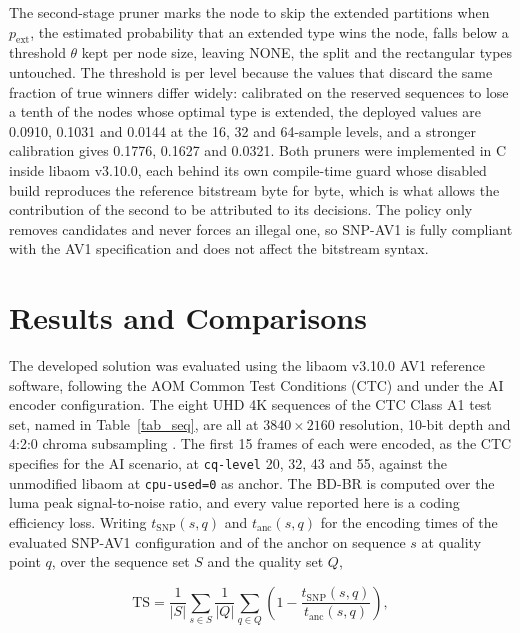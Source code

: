 \documentclass[conference]{IEEEtran}
\begin{document}
The second-stage pruner marks the node to skip the extended partitions when
$p_{\mathrm{ext}}$, the estimated probability that an extended type wins the node,
falls below a threshold $\theta$ kept per node size, leaving NONE, the split and
the rectangular types untouched. The threshold is per level because the values
that discard the same fraction of true winners differ widely: calibrated on the
reserved sequences to lose a tenth of the nodes whose optimal type is extended,
the deployed values are 0.0910, 0.1031 and 0.0144 at the 16, 32 and 64-sample
levels, and a stronger calibration gives 0.1776, 0.1627 and 0.0321. Both pruners
were implemented in C inside libaom v3.10.0, each behind its own compile-time
guard whose disabled build reproduces the reference bitstream byte for byte,
which is what allows the contribution of the second to be attributed to its
decisions. The policy only removes candidates and never forces an illegal one, so
SNP-AV1 is fully compliant with the AV1 specification and does not affect the
bitstream syntax.

\section{Results and Comparisons}
\label{sec_results}

The developed solution was evaluated using the libaom v3.10.0 AV1 reference
software, following the AOM Common Test Conditions (CTC) \cite{ctc} and under the
AI encoder configuration. The eight UHD 4K sequences of the CTC Class A1 test set,
named in Table~\ref{tab_seq}, are all at $3840\times2160$ resolution, 10-bit depth
and 4:2:0 chroma subsampling \cite{xipha1}. The first 15 frames of each were
encoded, as the CTC specifies for the AI scenario, at \texttt{cq-level} 20, 32, 43
and 55, against the unmodified libaom at \texttt{cpu-used=0} as anchor. The BD-BR
\cite{bjontegaard} is computed over the luma peak signal-to-noise ratio, and
every value reported here is a coding efficiency loss. Writing
$t_{\mathrm{SNP}}(s,q)$ and $t_{\mathrm{anc}}(s,q)$ for the encoding times of the
evaluated SNP-AV1 configuration and of the anchor on sequence $s$ at quality
point $q$, over the sequence set $S$ and the quality set $Q$,

\begin{equation}
\mathrm{TS} = \frac{1}{|S|} \sum_{s \in S} \frac{1}{|Q|} \sum_{q \in Q}
\left( 1 - \frac{t_{\mathrm{SNP}}(s,q)}{t_{\mathrm{anc}}(s,q)} \right),
\label{eq_ts}
\end{equation}
\end{document}
